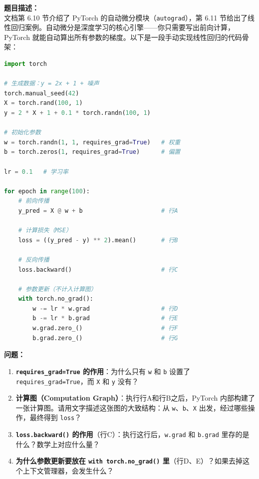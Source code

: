 \documentclass[a4paper,11pt]{ctexart}
\begin{document}
\begin{problembox}
    \textbf{题目描述：}\\
    文档第 6.10 节介绍了 PyTorch 的自动微分模块（\texttt{autograd}），第 6.11 节给出了线性回归案例。自动微分是深度学习的核心引擎——你只需要写出前向计算，PyTorch 就能自动算出所有参数的梯度。以下是一段手动实现线性回归的代码骨架：

    \begin{lstlisting}[language=Python]
import torch

# 生成数据：y = 2x + 1 + 噪声
torch.manual_seed(42)
X = torch.rand(100, 1)
y = 2 * X + 1 + 0.1 * torch.randn(100, 1)

# 初始化参数
w = torch.randn(1, 1, requires_grad=True)   # 权重
b = torch.zeros(1, requires_grad=True)      # 偏置

lr = 0.1   # 学习率

for epoch in range(100):
    # 前向传播
    y_pred = X @ w + b                      # 行A

    # 计算损失（MSE）
    loss = ((y_pred - y) ** 2).mean()       # 行B

    # 反向传播
    loss.backward()                         # 行C

    # 参数更新（不计入计算图）
    with torch.no_grad():
        w -= lr * w.grad                    # 行D
        b -= lr * b.grad                    # 行E
        w.grad.zero_()                      # 行F
        b.grad.zero_()                      # 行G
    \end{lstlisting}

    \textbf{问题：}
    \begin{enumerate}[(1)]
        \item \textbf{\texttt{requires\_grad=True} 的作用}：为什么只有 \texttt{w} 和 \texttt{b} 设置了 \texttt{requires\_grad=True}，而 \texttt{X} 和 \texttt{y} 没有？

        \item \textbf{计算图（Computation Graph）}：执行行A和行B之后，PyTorch 内部构建了一张计算图。请用文字描述这张图的大致结构：从 \texttt{w}、\texttt{b}、\texttt{X} 出发，经过哪些操作，最终得到 \texttt{loss}？

        \item \textbf{\texttt{loss.backward()} 的作用}（行C）：执行这行后，\texttt{w.grad} 和 \texttt{b.grad} 里存的是什么？数学上对应什么量？

        \item \textbf{为什么参数更新要放在 \texttt{with torch.no\_grad()} 里}（行D、E）？如果去掉这个上下文管理器，会发生什么？


\end{enumerate}
\end{problembox}
\end{document}
